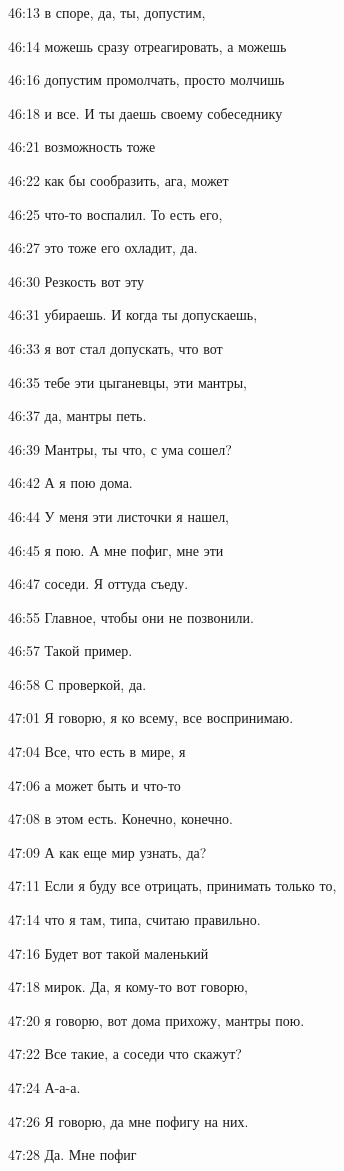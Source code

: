 46:13
в споре, да, ты, допустим,

46:14
можешь сразу отреагировать, а можешь

46:16
допустим промолчать, просто молчишь

46:18
и все. И ты даешь своему собеседнику

46:21
возможность тоже

46:22
как бы сообразить, ага, может

46:25
что-то воспалил. То есть его,

46:27
это тоже его охладит, да.

46:30
Резкость вот эту

46:31
убираешь. И когда ты допускаешь,

46:33
я вот стал допускать, что вот

46:35
тебе эти цыганевцы, эти мантры,

46:37
да, мантры петь.

46:39
Мантры, ты что, с ума сошел?

46:42
А я пою дома.

46:44
У меня эти листочки я нашел,

46:45
я пою. А мне пофиг, мне эти

46:47
соседи. Я оттуда съеду.

46:55
Главное, чтобы они не позвонили.

46:57
Такой пример.

46:58
С проверкой, да.

47:01
Я говорю, я ко всему, все воспринимаю.

47:04
Все, что есть в мире, я

47:06
а может быть и что-то

47:08
в этом есть. Конечно, конечно.

47:09
А как еще мир узнать, да?

47:11
Если я буду все отрицать, принимать только то,

47:14
что я там, типа, считаю правильно.

47:16
Будет вот такой маленький

47:18
мирок. Да, я кому-то вот говорю,

47:20
я говорю, вот дома прихожу, мантры пою.

47:22
Все такие, а соседи что скажут?

47:24
А-а-а.

47:26
Я говорю, да мне пофигу на них.

47:28
Да. Мне пофиг

